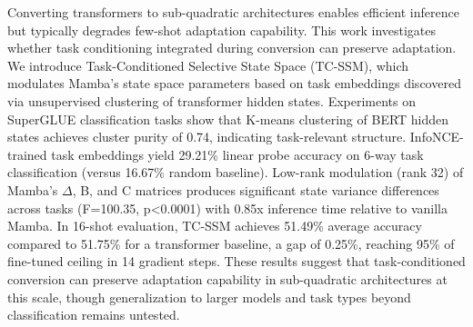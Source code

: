 
Converting transformers to sub-quadratic architectures enables efficient inference but typically degrades few-shot adaptation capability. This work investigates whether task conditioning integrated during conversion can preserve adaptation. We introduce Task-Conditioned Selective State Space (TC-SSM), which modulates Mamba's state space parameters based on task embeddings discovered via unsupervised clustering of transformer hidden states. Experiments on SuperGLUE classification tasks show that K-means clustering of BERT hidden states achieves cluster purity of 0.74, indicating task-relevant structure. InfoNCE-trained task embeddings yield 29.21\% linear probe accuracy on 6-way task classification (versus 16.67\% random baseline). Low-rank modulation (rank 32) of Mamba's $\Delta$, B, and C matrices produces significant state variance differences across tasks (F=100.35, p<0.0001) with 0.85x inference time relative to vanilla Mamba. In 16-shot evaluation, TC-SSM achieves 51.49\% average accuracy compared to 51.75\% for a transformer baseline, a gap of 0.25\%, reaching 95\% of fine-tuned ceiling in 14 gradient steps. These results suggest that task-conditioned conversion can preserve adaptation capability in sub-quadratic architectures at this scale, though generalization to larger models and task types beyond classification remains untested.

